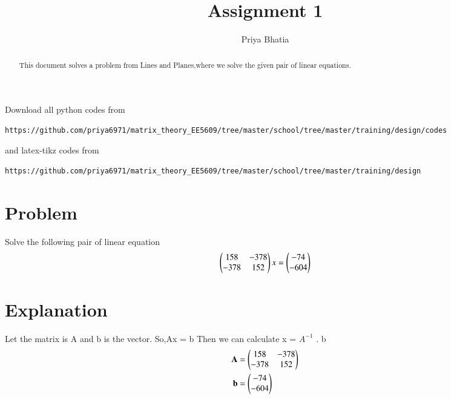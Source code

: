 \documentclass[journal,12pt,twocolumn]{IEEEtran}
\begin{document}
     \def\rightbox#1{\makebox[0in][r]{#1}}
     \def\centbox#1{\makebox[0in]{#1}}
     \def\topbox#1{\raisebox{-\baselineskip}[0in][0in]{#1}}
     \def\midbox#1{\raisebox{-0.5\baselineskip}[0in][0in]{#1}}
\vspace{3cm}
\title{Assignment 1}
\author{Priya Bhatia}
\maketitle
\newpage
\bigskip
\renewcommand{\thefigure}{\theenumi}
\renewcommand{\thetable}{\theenumi}
\begin{abstract}
This document solves a problem from Lines and Planes,where we solve the given pair of linear equations.
\end{abstract}
Download all python codes from
\begin{lstlisting}
https://github.com/priya6971/matrix_theory_EE5609/tree/master/school/tree/master/training/design/codes
\end{lstlisting}
%
and latex-tikz codes from
%
\begin{lstlisting}
https://github.com/priya6971/matrix_theory_EE5609/tree/master/school/tree/master/training/design
\end{lstlisting}
%
\section{Problem}
Solve the following pair of linear equation
\begin{align}
\begin{pmatrix}  158 & -378 \\ -378 & 152\end{pmatrix} x =
\begin{pmatrix}  -74 \\ -604\end{pmatrix}
\end{align}
\section{Explanation}
Let the matrix is A and b is the vector.
So,Ax = b
Then we can calculate x = $A^{-1}$ . b
\begin{align}
\mathbf{A}&= \begin{pmatrix}158 & -378 \\ -378 & 152\end{pmatrix} \\
\mathbf{b}&= \begin{pmatrix}-74 \\ -604\end{pmatrix}
\end{align}
\end{document}
